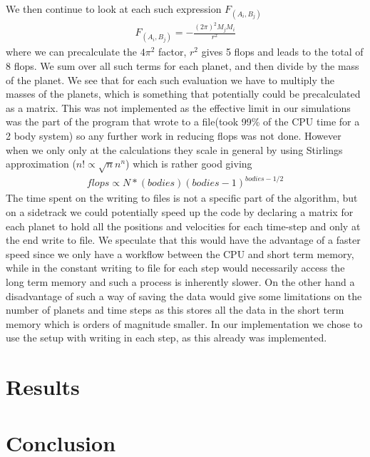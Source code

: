\documentclass[a4paper,11pt]{article}
\begin{document}
{\begin{align}
\end{align}
We then continue to look at each such expression $F_{(A_i,B_j)}$
\begin{align}
F_{(A_i,B_j)}= -\frac{(2\pi)^2 M_j M_i}{r^2}
\end{align}
where we can precalculate the $4\pi^2$ factor, $r^2$ gives 5 flops and leads to the total of 8 flops. We sum over all such terms for each planet, and then divide by the mass of the planet. We see that for each such evaluation we have to multiply the masses of the planets, which is something that potentially could be precalculated as a matrix. This was not implemented as the effective limit in our simulations was the part of the program that wrote to a file(took 99\% of the CPU time for a 2 body system) so any further work in reducing flops was not done. However when we only only at the calculations they scale in general by using Stirlings approximation ($n! \propto \sqrt{n}n^n$) which is rather good giving
\begin{align}
	flops \propto N * (bodies)(bodies-1)^{bodies-1/2}
\end{align}
The time spent on the writing to files is not a specific part of the algorithm, but on a sidetrack we could potentially speed up the code by declaring a matrix for each planet to hold all the positions and velocities for each time-step and only at the end write to file. We speculate that this would have the advantage of a faster speed since we only have a workflow between the CPU and short term memory, while in the constant writing to file for each step would necessarily access the long term memory and such a process is inherently slower. On the other hand a disadvantage of such a way of saving the data would give some limitations on the number of planets and time steps as this stores all the data in the short term memory which is orders of magnitude smaller. In our implementation we chose to use the setup with writing in each step, as this already was implemented. 
\section*{Results}





\section*{Conclusion}






}
\end{document}
